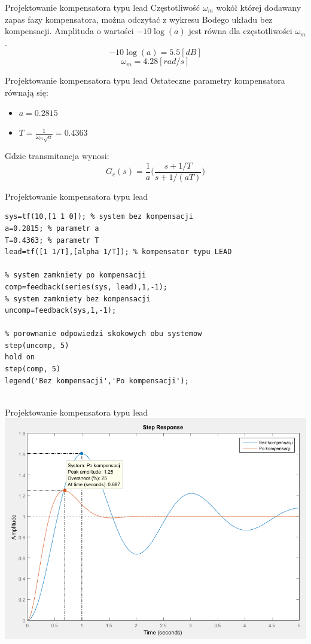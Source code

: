 \documentclass{beamer}
\begin{document}
\begin{frame}{Projektowanie kompensatora typu lead}
Częstotliwość $\omega_{m}$ wokół której dodawany zapas fazy kompensatora, można odczytać z wykresu Bodego układu bez kompensacji. Amplituda o wartości $-10\log(a)$ jest równa dla częstotliwości $\omega_{m}$.
\begin{equation*}
	-10\log(a) = 5.5 [dB]
 \end{equation*}
 \begin{equation*} 
 \omega_{m} = 4.28 [rad/s]
 \end{equation*}
\end{frame}


\begin{frame}{Projektowanie kompensatora typu lead}
	Ostateczne parametry kompensatora równają się:
	\begin{itemize}
		\item $a = 0.2815$
		\item $T = \frac{1}{\omega_m \sqrt{a}} = 0.4363$
	\end{itemize}
	Gdzie transmitancja wynosi:
	\begin{equation*}
	G_{c}(s) = \frac{1}{a} \bigg(\frac{s + 1/T}{s + 1/(aT)} \bigg) 
	\end{equation*}
\end{frame}

\begin{frame}[fragile]{Projektowanie kompensatora typu lead}

\begin{lstlisting} 
sys=tf(10,[1 1 0]); % system bez kompensacji
a=0.2815; % parametr a
T=0.4363; % parametr T
lead=tf([1 1/T],[alpha 1/T]); % kompensator typu LEAD

% system zamkniety po kompensacji
comp=feedback(series(sys, lead),1,-1);
% system zamkniety bez kompensacji
uncomp=feedback(sys,1,-1);

% porownanie odpowiedzi skokowych obu systemow
step(uncomp, 5)
hold on
step(comp, 5)
legend('Bez kompensacji','Po kompensacji');


\end{lstlisting}

\end{frame}

\begin{frame}{Projektowanie kompensatora typu lead}
	\includegraphics[width = \linewidth]{step}
\end{frame}	
\end{document}
